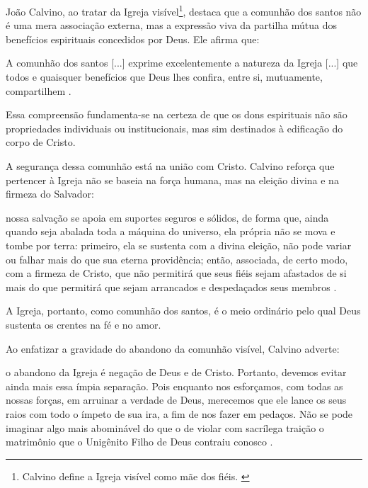 João Calvino, ao tratar da Igreja visível\footnote{Calvino define a Igreja visível como mãe dos fiéis. \cite[v.~4, p.~1865]{calvino2022}}, destaca que a comunhão dos santos não é uma mera associação externa, mas a expressão viva da partilha mútua dos benefícios espirituais concedidos por Deus. Ele afirma que:

\begin{citacao}
    A comunhão dos santos [...] exprime excelentemente a natureza da Igreja [...] que todos e quaisquer benefícios que Deus lhes confira, entre si, mutuamente, compartilhem \cite[v.~4, p.~1863]{calvino2022}.
\end{citacao}

Essa compreensão fundamenta-se na certeza de que os dons espirituais não são propriedades individuais ou institucionais, mas sim destinados à edificação do corpo de Cristo.

A segurança dessa comunhão está na união com Cristo. Calvino reforça que pertencer à Igreja não se baseia na força humana, mas na eleição divina e na firmeza do Salvador:

\begin{citacao}
    nossa salvação se apoia em suportes seguros e sólidos, de forma que, ainda quando seja abalada toda a máquina do universo, ela própria não se mova e tombe por terra: primeiro, ela se sustenta com a divina eleição, não pode variar ou falhar mais do que sua eterna providência; então, associada, de certo modo, com a firmeza de Cristo, que não permitirá que seus fiéis sejam afastados de si mais do que permitirá que sejam arrancados e despedaçados seus membros \cite[v.~4, pp.~1863--1864]{calvino2022}.
\end{citacao}

A Igreja, portanto, como comunhão dos santos, é o meio ordinário pelo qual Deus sustenta os crentes na fé e no amor.

Ao enfatizar a gravidade do abandono da comunhão visível, Calvino adverte:

\begin{citacao}
    o abandono da Igreja é negação de Deus e de Cristo. Portanto, devemos evitar ainda mais essa ímpia separação. Pois enquanto nos esforçamos, com todas as nossas forças, em arruinar a verdade de Deus, merecemos que ele lance os seus raios com todo o ímpeto de sua ira, a fim de nos fazer em pedaços. Não se pode imaginar algo mais abominável do que o de violar com sacrílega traição o matrimônio que o Unigênito Filho de Deus contraiu conosco \cite[v.~4, pp.~1877--1878]{calvino2022}.
\end{citacao}

